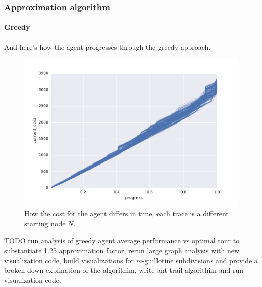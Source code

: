 \documentclass[11pt]{beamer}
\begin{document}
	\begin{frame}
		\frametitle{Approximation algorithm}
		\framesubtitle{Greedy}
		\centering
		And here's how the agent progresses through the greedy approach.
		\begin{figure}
			\centering
			\includegraphics[width=0.7\linewidth]{"img/Simple greedy approach, small graph/cost_progress_trace"}
			\caption{How the cost for the agent differs in time, each trace is a different starting node $N$.}
		\end{figure}
	\end{frame}
	\begin{frame}{TODO}
		run analysis of greedy agent average performance vs optimal tour to substantiate 1.25 approximation factor, rerun large graph analysis with new visualization code, build visualizations for $m$-guillotine subdivisions and provide a broken-down explination of the algorithim, write ant trail algorithim and run visualization code.
	\end{frame}
\end{document}
